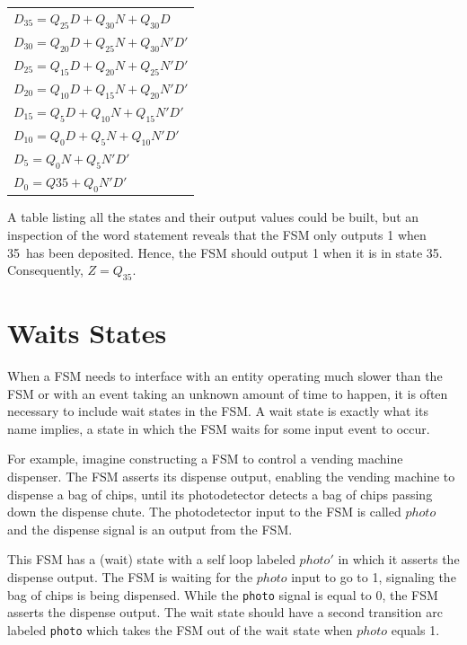 \begin{tabular}{l}

    $D_{35} = Q_{25}D + Q_{30}N + Q_{30}D$ \\
    $D_{30} = Q_{20}D + Q_{25}N + Q_{30}N'D'$ \\
    $D_{25} = Q_{15}D + Q_{20}N + Q_{25}N'D'$ \\
    $D_{20} = Q_{10}D + Q_{15}N + Q_{20}N'D'$ \\
    $D_{15} = Q_{5}D +  Q_{10}N + Q_{15}N'D'$ \\
    $D_{10} = Q_{0}D +   Q_{5}N    + Q_{10}N'D'$ \\
    $D_{5}  =                     Q_{0}N  + Q_{5}N'D'$ \\
    $D_{0}  = Q{35} + Q_{0}N'D'$ \\

\end{tabular}

A table listing all the states and their output values could be built,
but an inspection of the word statement reveals that the FSM only
outputs 1 when 35\textcent~has been deposited.  Hence, the FSM should
output 1 when it is in state 35\textcent.  Consequently, $Z=Q_{35}$.


\section{Waits States}
When a FSM needs to interface with an entity operating much
slower than the FSM or with an event taking an unknown amount
of time to happen, it is often necessary to include wait states in
the FSM.  A wait state is exactly what its name implies, a state in
which the FSM waits for some input event to occur.

For example, imagine  constructing a FSM to control
a vending machine dispenser.  The FSM asserts its dispense output,
enabling the vending machine to dispense a bag of chips, until its
photodetector detects a bag of chips passing down the
dispense chute.  The photodetector input to the FSM is called
$photo$ and the dispense signal is an output from the FSM.

This FSM has a (wait) state with a self loop labeled
$photo'$ in which it asserts the dispense output.  The FSM is
waiting for the $photo$ input to go to 1, signaling the bag of
chips is being dispensed.  While the \verb+photo+ signal is equal to
0, the FSM asserts the dispense output.  The wait state should have
a second transition arc labeled \verb+photo+ which takes the FSM out
of the wait state when $photo$ equals 1.

